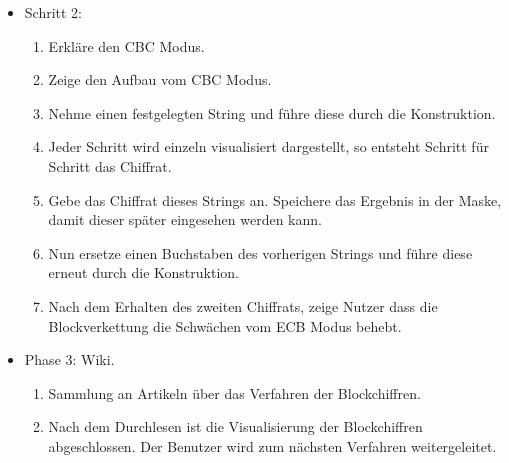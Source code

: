 \documentclass{article}
\begin{document}
\begin{itemize}[label={}]
 \item Schritt 2:

	\begin{enumerate}
	 \item Erkläre den \gls{CBC} Modus.
	 \item Zeige den Aufbau vom \gls{CBC} Modus.
	 \item Nehme einen festgelegten String und führe diese durch die Konstruktion.
	 \item Jeder Schritt wird einzeln visualisiert dargestellt, so entsteht Schritt für Schritt das Chiffrat.
	 \item Gebe das Chiffrat dieses Strings an. Speichere das Ergebnis in der Maske, damit dieser später eingesehen werden kann.
	 \item Nun ersetze einen Buchstaben des vorherigen Strings und führe diese erneut durch die Konstruktion.
	 \item Nach dem Erhalten des zweiten Chiffrats, zeige Nutzer dass die Blockverkettung die Schwächen vom \gls{ECB} Modus behebt.
	\end{enumerate}
	
 \item Phase 3: Wiki.

	\begin{enumerate}
	 \item Sammlung an Artikeln über das Verfahren der Blockchiffren.
	 \item Nach dem Durchlesen ist die Visualisierung der Blockchiffren abgeschlossen. Der Benutzer wird zum nächsten Verfahren weitergeleitet.
 	\end{enumerate}

\end{itemize}
\end{document}
